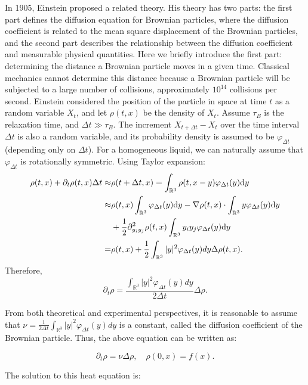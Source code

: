 In 1905, Einstein proposed a related theory. His theory has two parts: the first part defines the diffusion equation for Brownian particles, where the diffusion coefficient is related to the mean square displacement of the Brownian particles, and the second part describes the relationship between the diffusion coefficient and measurable physical quantities. Here we briefly introduce the first part: determining the distance a Brownian particle moves in a given time. Classical mechanics cannot determine this distance because a Brownian particle will be subjected to a large number of collisions, approximately \(10^{14}\) collisions per second. Einstein considered the position of the particle in space at time \( t \) as a random variable \( X_t \), and let \( \rho(t,x) \) be the density of \( X_t \). Assume \( \tau_B \) is the relaxation time, and \( \Delta t \gg \tau_B \). The increment \( X_{t+\Delta t} - X_t \) over the time interval \( \Delta t \) is also a random variable, and its probability density is assumed to be \( \varphi_{\Delta t} \) (depending only on \( \Delta t \)). For a homogeneous liquid, we can naturally assume that \( \varphi_{\Delta t} \) is rotationally symmetric. Using Taylor expansion:
\begin{align*}
    \rho(t,x) + \partial_t \rho(t,x) \Delta t \approx & \rho(t + \Delta t, x) = \int_{\mathbb{R}^3} \rho(t,x-y) \varphi_{\Delta t}(y) \text{\rm{d}} y\\
    \approx& \rho(t,x) \int_{\mathbb{R}^3} \varphi_{\Delta t}(y) \text{\rm{d}} y - \nabla \rho(t,x) \cdot \int_{\mathbb{R}^3} y \varphi_{\Delta t}(y) \text{\rm{d}} y\\
    &+ \frac{1}{2} \partial_{y_iy_j}^2 \rho(t,x) \int_{\mathbb{R}^3} y_iy_j \varphi_{\Delta t}(y) \text{\rm{d}} y\\
    =& \rho(t,x) + \frac{1}{2} \int_{\mathbb{R}^3} |y|^2 \varphi_{\Delta t}(y) dy \Delta \rho(t,x).
\end{align*}
Therefore,
\[
\partial_t \rho = \frac{\int_{\mathbb{R}^3} |y|^2 \varphi_{\Delta t}(y) dy}{2\Delta t} \Delta \rho.
\]

From both theoretical and experimental perspectives, it is reasonable to assume that \( \nu = \frac{1}{2\Delta t} \int_{\mathbb{R}^3} |y|^2 \varphi_{\Delta t}(y) dy \) is a constant, called the diffusion coefficient of the Brownian particle. Thus, the above equation can be written as:

\[
\partial_t \rho = \nu \Delta \rho, \quad \rho(0,x) = f(x).
\]

The solution to this heat equation is:

